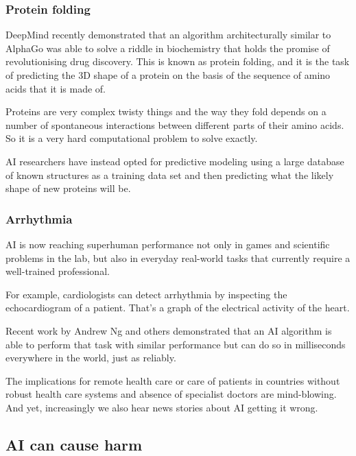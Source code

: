 \documentclass[
]{book}
\theoremstyle{definition}
\theoremstyle{definition}
\theoremstyle{definition}
\theoremstyle{definition}
\theoremstyle{remark}
\begin{document}
\hypertarget{protein-folding}{%
\subsubsection{Protein folding}\label{protein-folding}}

DeepMind recently demonstrated that an algorithm architecturally similar to AlphaGo was able to solve a riddle in biochemistry that holds the promise of
revolutionising drug discovery. This is known as protein folding, and
it is the task of predicting the 3D shape of a protein on the basis of the sequence of amino acids that it is made of.

Proteins are very complex twisty things and the way they fold depends on a number of spontaneous interactions between different parts of their amino acids. So it is a very hard computational
problem to solve exactly.

AI researchers have instead opted for predictive modeling using a large database of known structures as a training data set and then predicting what the likely shape of new proteins will be.

\hypertarget{arrhythmia}{%
\subsubsection{Arrhythmia}\label{arrhythmia}}

AI is now reaching superhuman performance not only in games and scientific problems in the lab, but also in everyday real-world tasks that currently require
a well-trained professional.

For example, cardiologists can detect arrhythmia by inspecting the echocardiogram of a patient. That's a graph of the electrical
activity of the heart.

Recent work by Andrew Ng and others demonstrated that an AI algorithm is able to perform that task with similar performance but can do so in milliseconds everywhere in the world, just as reliably.

The implications for remote health care or care of patients in countries without robust health care systems and absence of specialist doctors are mind-blowing. And yet, increasingly we also hear news stories about AI getting it wrong.

\hypertarget{ai-can-cause-harm}{%
\subsection{AI can cause harm}\label{ai-can-cause-harm}}
\end{document}
